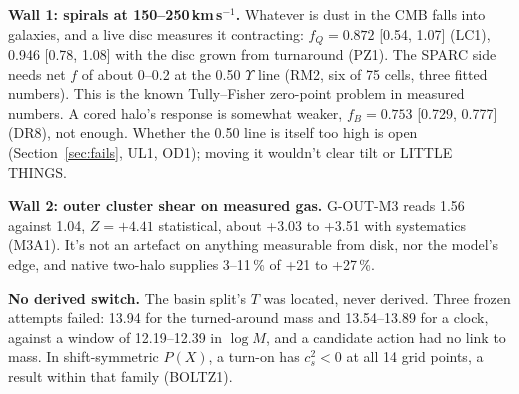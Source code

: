 \documentclass[10pt]{article}
\begin{document}
\textbf{Wall 1: spirals at 150--250\,km\,s$^{-1}$.} Whatever is dust in the CMB falls into galaxies, and a live disc measures it contracting: $f_Q=0.872$ [0.54, 1.07] (LC1), 0.946 [0.78, 1.08] with the disc grown from turnaround (PZ1). The SPARC side needs net $f$ of about 0--0.2 at the 0.50 $\Upsilon$ line (RM2, six of 75 cells, three fitted numbers). This is the known Tully--Fisher zero-point problem \cite{D08} in measured numbers. A cored halo's response is somewhat weaker, $f_B=0.753$ [0.729, 0.777] (DR8), not enough. Whether the 0.50 line is itself too high is open (Section~\ref{sec:fails}, UL1, OD1); moving it wouldn't clear tilt or LITTLE THINGS.

\textbf{Wall 2: outer cluster shear on measured gas.} G-OUT-M3 reads 1.56 against 1.04, $Z=+4.41$ statistical, about +3.03 to +3.51 with systematics (M3A1). It's not an artefact on anything measurable from disk, nor the model's edge, and native two-halo supplies 3--11\,\% of +21 to +27\,\%.

\textbf{No derived switch.} The basin split's $T$ was located, never derived. Three frozen attempts failed: 13.94 for the turned-around mass and 13.54--13.89 for a clock, against a window of 12.19--12.39 in $\log M$, and a candidate action had no link to mass. In shift-symmetric $P(X)$, a turn-on has $c_s^2<0$ at all 14 grid points, a result within that family (BOLTZ1).
\end{document}
